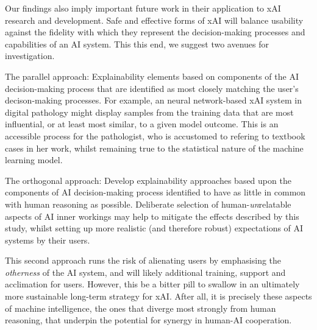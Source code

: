 Our findings also imply important future work in their application to xAI research and development. Safe and effective forms of xAI will balance usability against the fidelity with which they represent the decision-making processes and capabilities of an AI system. This this end, we suggest two avenues for investigation. 

The parallel approach: Explainability elements based on components of the AI decision-making process that are identified as most closely matching the user's decison-making processes. For example, an neural network-based xAI system in digital pathology might display samples from the training data that are most influential, or at least most similar, to a given model outcome. This is an accessible process for the pathologist, who is accustomed to refering to textbook cases in her work, whilst remaining true to the statistical nature of the machine learning model.

The orthogonal approach: Develop explainability approaches based upon the components of AI decision-making process identified to have as little in common with human reasoning as possible. Deliberate selection of human-\textit{un}relatable aspects of AI inner workings may help to mitigate the effects described by this study, whilst setting up more realistic (and therefore robust) expectations of AI systems by their users. 

This second approach runs the risk of alienating users by emphasising the \textit{otherness} of the AI system, and will likely additional training, support and acclimation for users. However, this be a bitter pill to swallow in an ultimately more sustainable long-term strategy for xAI. After all, it is precisely these aspects of machine intelligence, the ones that diverge most strongly from human reasoning, that underpin the potential for synergy in human-AI cooperation.

